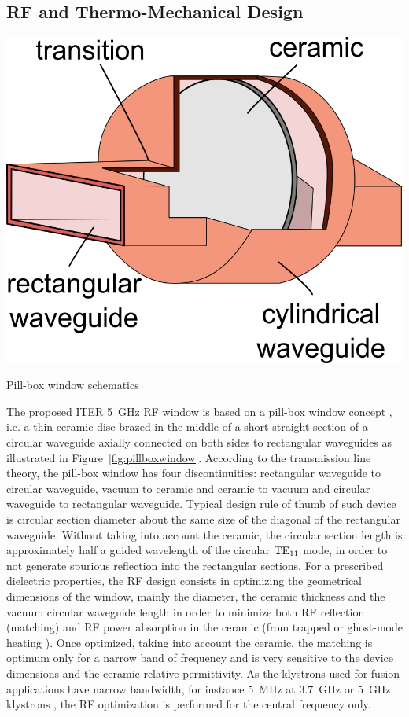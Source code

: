 \subsection{RF and Thermo-Mechanical Design}
\begin{marginfigure}
	\centering
	\includegraphics[width=1.0\linewidth]{figures/chap3/pillbox_window}
	\caption{Pill-box window schematics}
	\label{fig:pillboxwindow}
\end{marginfigure}

The proposed ITER 5~\si{GHz} RF window is based on a pill-box window concept , i.e. a thin ceramic disc brazed in the middle of a short straight section of a circular waveguide axially connected on both sides to rectangular waveguides as illustrated in Figure~\ref{fig:pillboxwindow}. According to the transmission line theory, the pill-box window has four discontinuities: rectangular waveguide to circular waveguide, vacuum to ceramic and ceramic to vacuum and circular waveguide to rectangular waveguide. Typical design rule of thumb of such device is circular section diameter about the same size of the diagonal of the rectangular waveguide. Without taking into account the ceramic, the circular section length is approximately half a guided wavelength of the circular ${\mathrm{TE}}_{11}$ mode, in order to not generate spurious reflection into the rectangular sections. For a prescribed dielectric properties, the RF design consists in optimizing the geometrical dimensions of the window, mainly the diameter, the ceramic thickness and the vacuum circular waveguide length in order to minimize both RF reflection (matching) and RF power absorption in the ceramic (from trapped or ghost-mode heating \cite{ives1993} ). Once optimized, taking into account the ceramic, the matching is optimum only for a narrow band of frequency and is very sensitive to the device dimensions and the ceramic relative permittivity. As the klystrons used for fusion applications have narrow bandwidth, for instance 5~MHz at 3.7~GHz  or 5~GHz klystrons , the RF optimization is performed for the central frequency only. 

